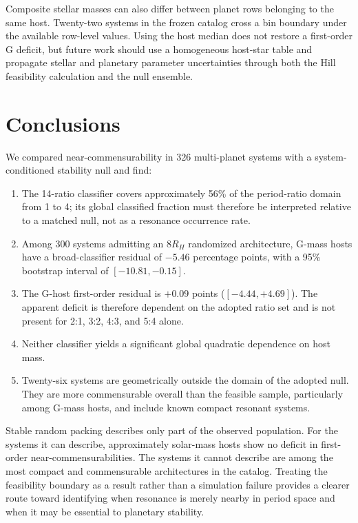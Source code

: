 \documentclass[twocolumn,linenumbers]{aastex631}
\begin{document}
Composite stellar masses can also differ between planet rows belonging to the
same host. Twenty-two systems in the frozen catalog cross a bin boundary under
the available row-level values. Using the host median does not restore a
first-order G deficit, but future work should use a homogeneous host-star table
and propagate stellar and planetary parameter uncertainties through both the
Hill feasibility calculation and the null ensemble.

\section{Conclusions}

We compared near-commensurability in 326 multi-planet systems with a
system-conditioned stability null and find:

\begin{enumerate}
\item The 14-ratio classifier covers approximately 56\% of the period-ratio
domain from 1 to 4; its global classified fraction must therefore be interpreted
relative to a matched null, not as a resonance occurrence rate.

\item Among 300 systems admitting an $8R_H$ randomized architecture, G-mass
hosts have a broad-classifier residual of $-5.46$ percentage points, with a
95\% bootstrap interval of $[-10.81,-0.15]$.

\item The G-host first-order residual is $+0.09$ points
($[-4.44,+4.69]$). The apparent deficit is therefore dependent on the adopted
ratio set and is not present for 2:1, 3:2, 4:3, and 5:4 alone.

\item Neither classifier yields a significant global quadratic dependence on
host mass.

\item Twenty-six systems are geometrically outside the domain of the adopted
null. They are more commensurable overall than the feasible sample, particularly
among G-mass hosts, and include known compact resonant systems.
\end{enumerate}

Stable random packing describes only part of the observed population. For the
systems it can describe, approximately solar-mass hosts show no deficit in
first-order near-commensurabilities. The systems it cannot describe are among
the most compact and commensurable architectures in the catalog. Treating the
feasibility boundary as a result rather than a simulation failure provides a
clearer route toward identifying when resonance is merely nearby in period
space and when it may be essential to planetary stability.
\end{document}
